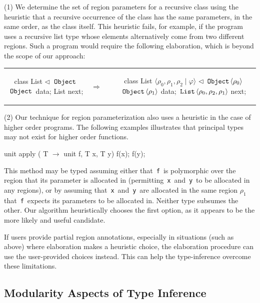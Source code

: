 \documentclass[a4paper,UKenglish]{lipics-v2018}
\newcommand{\C}[1]{\code{#1}}
\newcommand{\code}[1]{\,{\tt #1}\,}
\newcommand{\ObjZ}{\C{Object}}
\newcommand{\extends}{\triangleleft}
\begin{document}
 (1) We determine the set of region parameters for a recursive class
using the heuristic that a recursive occurrence of the class has
the same parameters, in the same order, as the class itself.
This heuristic fails, for example, if the program uses a recursive list type whose
elements alternatively come from two different regions. Such a program would require
the following elaboration, which is beyond the scope of our approach:

\begin{tabular}{ccc}
\begin{minipage}{0.32\linewidth}
\begin{codejava}
class List $\extends$ $\ObjZ$
{
  $\ObjZ$ data;
  List next;
}
\end{codejava}
\end{minipage}
&
$\Rightarrow  \; \; \;$
&
\begin{minipage}{0.5\linewidth}
\begin{codejava}
class List $\langle \rho_0, \rho_1, \rho_2 \; | \; \varphi \rangle$ $\extends$ $\ObjZ \langle \rho_0 \rangle$
{
  $\ObjZ \langle \rho_1 \rangle$ data;
  $\C{List} \langle \rho_0, \rho_2, \rho_1 \rangle$ next;
}
\end{codejava}
\end{minipage}
\end{tabular}

  (2) Our technique for region parameterization also uses a heuristic in the case of
higher order programs. The following examples illustrates that principal types may
not exist for higher order functions.
\begin{codejava}
    unit apply ( T $\rightarrow$ unit f, T x, T y) { f(x); f(y); }
\end{codejava}
This method may be typed assuming either that \C{f} is polymorphic
over the region that its parameter is allocated in (permitting \C{x}
and \C{y} to be allocated in any regions), or by assuming that \C{x}
and \C{y} are allocated in the same region $\rho_1$ that \C{f} expects
its parameters to be allocated in. Neither type subsumes the other.
Our algorithm heuristically chooses the first option, as it appears to
be the more likely and useful candidate.

If users provide partial region annotations, especially in situations
(such as above) where elaboration makes a heuristic choice, the
elaboration procedure can use the user-provided choices instead.  This
can help the type-inference overcome these limitations.

\subsection{Modularity Aspects of Type Inference}
\end{document}
